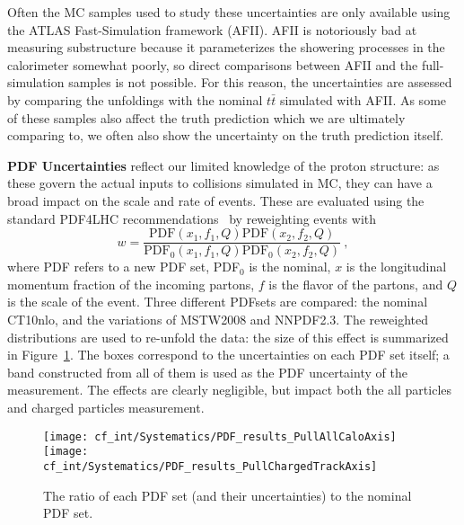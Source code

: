 	Often the MC samples used to study these uncertainties are only available using the ATLAS Fast-Simulation framework (AFII). AFII is notoriously bad at measuring substructure because it parameterizes the showering processes in the calorimeter somewhat poorly, so direct comparisons between AFII and the full-simulation samples is not possible. For this reason, the uncertainties are assessed by comparing the unfoldings with the nominal \PowPythia $t\bar{t}$ simulated with AFII. As some of these samples also affect the truth prediction which we are ultimately comparing to, we often also show the uncertainty on the truth prediction itself. 

	\textbf{PDF Uncertainties} reflect our limited knowledge of the proton structure: as these govern the actual inputs to collisions simulated in MC, they can have a broad impact on the scale and rate of events. These are evaluated using the standard PDF4LHC recommendations~\cite{Botje:2011sn} by reweighting events with
	\begin{equation}
    w = \frac{ \mathrm{PDF}(x_1, f_1, Q) \mathrm{PDF}(x_2, f_2, Q) }{ \mathrm{PDF}_0(x_1, f_1, Q) \mathrm{PDF}_0(x_2, f_2, Q) } \ ,
  \end{equation}
  	where PDF refers to a new PDF set, PDF$_0$ is the nominal, $x$ is the longitudinal momentum fraction of the incoming partons, $f$ is the flavor of the partons, and $Q$ is the scale of the event. Three different PDFsets are compared: the nominal CT10nlo, and the variations of MSTW2008 and NNPDF2.3. The reweighted distributions are used to re-unfold the data: the size of this effect is summarized in Figure~\ref{fig:color:uncertainties:theory:pdf}. The boxes correspond to the uncertainties on each PDF set itself; a band constructed from all of them is used as the PDF uncertainty of the measurement. The effects are clearly negligible, but impact both the all particles and charged particles measurement.


  \begin{figure}
    \begin{center}
    \texttt{[image: cf\_int/Systematics/PDF\_results\_PullAllCaloAxis]}
    \texttt{[image: cf\_int/Systematics/PDF\_results\_PullChargedTrackAxis]}
    \caption{The ratio of each PDF set (and their uncertainties) to the
    nominal PDF set.}
    \label{fig:color:uncertainties:theory:pdf}
    \end{center}
  \end{figure} 


